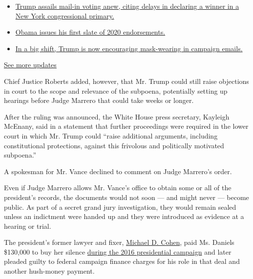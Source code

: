 \begin{itemize}
\tightlist
\item
  \href{https://www.nytimes.com/2020/08/03/us/elections/biden-vs-trump.html?action=click\&pgtype=Article\&state=default\&region=MAIN_CONTENT_1\&context=storylines_live_updates\#link-6494b448}{Trump
  assails mail-in voting anew, citing delays in declaring a winner in a
  New York congressional primary.}
\item
  \href{https://www.nytimes.com/2020/08/03/us/elections/biden-vs-trump.html?action=click\&pgtype=Article\&state=default\&region=MAIN_CONTENT_1\&context=storylines_live_updates\#link-3de249e6}{Obama
  issues his first slate of 2020 endorsements.}
\item
  \href{https://www.nytimes.com/2020/08/03/us/elections/biden-vs-trump.html?action=click\&pgtype=Article\&state=default\&region=MAIN_CONTENT_1\&context=storylines_live_updates\#link-54e34d20}{In
  a big shift, Trump is now encouraging mask-wearing in campaign
  emails.}
\end{itemize}

\href{https://www.nytimes.com/2020/08/03/us/elections/biden-vs-trump.html?action=click\&pgtype=Article\&state=default\&region=MAIN_CONTENT_1\&context=storylines_live_updates}{See
more updates}

Chief Justice Roberts added, however, that Mr. Trump could still raise
objections in court to the scope and relevance of the subpoena,
potentially setting up hearings before Judge Marrero that could take
weeks or longer.

After the ruling was announced, the White House press secretary,
Kayleigh McEnany, said in a statement that further proceedings were
required in the lower court in which Mr. Trump could ``raise additional
arguments, including constitutional protections, against this frivolous
and politically motivated subpoena.''

A spokesman for Mr. Vance declined to comment on Judge Marrero's order.

Even if Judge Marrero allows Mr. Vance's office to obtain some or all of
the president's records, the documents would not soon --- and might
never --- become public. As part of a secret grand jury investigation,
they would remain sealed unless an indictment were handed up and they
were introduced as evidence at a hearing or trial.

The president's former lawyer and fixer,
\href{https://www.nytimes.com/2020/07/22/nyregion/michael-cohen-donald-trump-prison.html}{Michael
D. Cohen}, paid Ms. Daniels \$130,000 to buy her silence
\href{https://www.nytimes.com/2019/08/01/nyregion/trump-cohen-stormy-daniels-vance.html}{during
the 2016 presidential campaign} and later pleaded guilty to federal
campaign finance charges for his role in that deal and another
hush-money payment.

